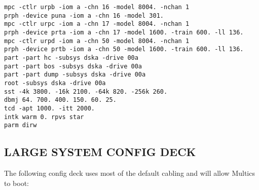 \begin{adjustwidth}{5ex}{1ex}
    \texttt{mpc  -ctlr   urpb -iom a -chn 16 -model 8004. -nchan 1} \\
    \texttt{prph -device puna -iom a -chn 16 -model 301.} \\
    \texttt{mpc  -ctlr   urpc -iom a -chn 17 -model 8004. -nchan 1} \\
    \texttt{prph -device prta -iom a -chn 17 -model 1600. -train 600. -ll 136.} \\
    \texttt{mpc  -ctlr   urpd -iom a -chn 50 -model 8004. -nchan 1} \\
    \texttt{prph -device prtb -iom a -chn 50 -model 1600. -train 600. -ll 136.} \\
    \texttt{part -part hc -subsys dska -drive 00a} \\
    \texttt{part -part bos -subsys dska -drive 00a} \\
    \texttt{part -part dump -subsys dska -drive 00a} \\
    \texttt{root -subsys dska -drive 00a} \\
    \texttt{sst  -4k 3800. -16k 2100. -64k 820. -256k 260.} \\
    \texttt{dbmj 64. 700. 400. 150. 60. 25.} \\
    \texttt{tcd -apt 1000. -itt 2000.} \\
    \texttt{intk warm 0. rpvs star} \\
    \texttt{parm dirw} \\    
\end{adjustwidth}  


\subsection[Large System Config Deck]{LARGE SYSTEM CONFIG DECK}

The following config deck uses most of the default cabling and will allow Multics to boot:

